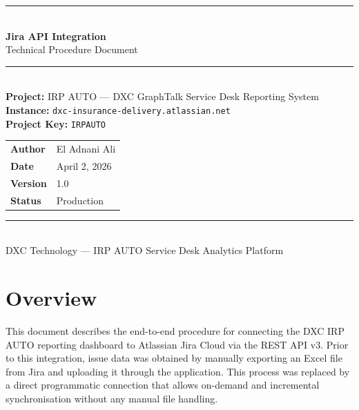 \documentclass[12pt, a4paper]{article}
\begin{document}
\begin{titlepage}
    \centering
    \vspace*{2cm}
    {\color{dxcpurple}\rule{\linewidth}{1.5pt}}\\[0.5cm]
    {\Huge\bfseries\color{dxcpurple} Jira API Integration}\\[0.3cm]
    {\Large Technical Procedure Document}\\[0.3cm]
    {\color{dxcpurple}\rule{\linewidth}{1.5pt}}\\[2cm]

    {\large\textbf{Project:} IRP AUTO — DXC GraphTalk Service Desk Reporting System}\\[0.5cm]
    {\large\textbf{Instance:} \texttt{dxc-insurance-delivery.atlassian.net}}\\[0.5cm]
    {\large\textbf{Project Key:} \texttt{IRPAUTO}}\\[2cm]

    \begin{tabular}{ll}
        \textbf{Author}   & El Adnani Ali \\[0.3cm]
        \textbf{Date}     & April 2, 2026 \\[0.3cm]
        \textbf{Version}  & 1.0 \\[0.3cm]
        \textbf{Status}   & Production \\
    \end{tabular}

    \vfill
    {\color{dxcpurple}\rule{\linewidth}{0.4pt}}\\[0.2cm]
    {\small DXC Technology — IRP AUTO Service Desk Analytics Platform}
\end{titlepage}

\tableofcontents
\newpage

\section{Overview}

This document describes the end-to-end procedure for connecting the DXC IRP AUTO reporting
dashboard to Atlassian Jira Cloud via the REST API v3. Prior to this integration, issue data
was obtained by manually exporting an Excel file from Jira and uploading it through the
application. This process was replaced by a direct programmatic connection that allows
on-demand and incremental synchronisation without any manual file handling.
\end{document}
